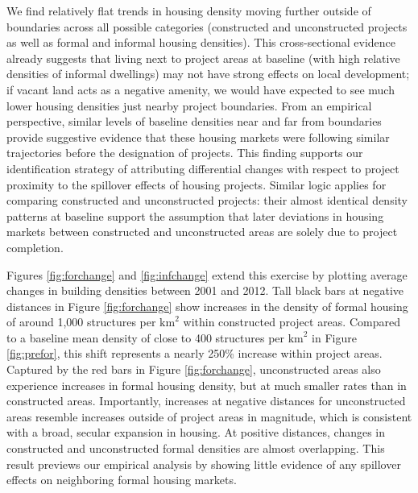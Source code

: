\documentclass[12pt]{article}
\begin{document}
We find relatively flat trends in housing density moving further outside of boundaries across all possible categories (constructed and unconstructed projects as well as formal and informal housing densities).  This cross-sectional evidence already suggests that living next to project areas at baseline (with high relative densities of informal dwellings) may not have strong effects on local development; if vacant land acts as a negative amenity, we would have expected to see much lower housing densities just nearby project boundaries.  From an empirical perspective, similar levels of baseline densities near and far from boundaries provide suggestive evidence that these housing markets were following similar trajectories before the designation of projects.  This finding supports our identification strategy of attributing differential changes with respect to project proximity to the spillover effects of housing projects.  Similar logic applies for comparing constructed and unconstructed projects: their almost identical density patterns at baseline support the assumption that later deviations in housing markets between constructed and unconstructed areas are solely due to project completion.

Figures \ref{fig:forchange} and \ref{fig:infchange} extend this exercise by plotting average changes in building densities between 2001 and 2012.  Tall black bars at negative distances in Figure \ref{fig:forchange} show increases in the density of formal housing of around 1,000 structures per $\text{km}^{2}$ within constructed project areas.  Compared to a baseline mean density of close to 400 structures per $\text{km}^{2}$ in Figure \ref{fig:prefor}, this shift represents a nearly 250\% increase within project areas.  Captured by the red bars in Figure \ref{fig:forchange}, unconstructed areas also experience increases in formal housing density, but at much smaller rates than in constructed areas.  Importantly, increases at negative distances for unconstructed areas resemble increases outside of project areas in magnitude, which is consistent with a broad, secular expansion in housing.  At positive distances, changes in constructed and unconstructed formal densities are almost overlapping.  This result previews our empirical analysis by showing little evidence of any spillover effects on neighboring formal housing markets.
\end{document}
